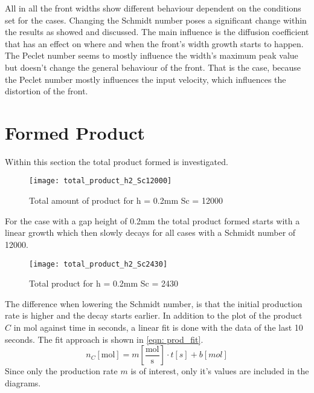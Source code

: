 \documentclass[../thesis.tex]{subfiles}
\begin{document}
All in all the front widths show different behaviour dependent on the conditions set for the cases. Changing the Schmidt number poses a significant change within the results as showed and discussed. The main influence is the diffusion coefficient that has an effect on where and when the front's width growth starts to happen. The Peclet number seems to mostly influence the width's maximum peak value but doesn't change the general behaviour of the front. That is the case, because the Peclet number mostly influences the input velocity, which influences the distortion of the front.

\section{Formed Product}

Within this section the total product formed is investigated. 

\begin{figure}[htb]
	\centering
	\texttt{[image: total\_product\_h2\_Sc12000]}
	\caption{Total amount of product for h = 0.2mm Sc = 12000}
	\label{fig: total_prod_h2_Sc12000}
\end{figure}
For the case with a gap height of 0.2mm the total product formed starts with a linear growth which then slowly decays for all cases with a Schmidt number of 12000.
\begin{figure}[htb]
	\centering
	\texttt{[image: total\_product\_h2\_Sc2430]}
	\caption{Total product for  h = 0.2mm Sc = 2430}
	\label{fig: total_prod_h2_Sc2430}
\end{figure}
The difference when lowering the Schmidt number, is that the initial production rate is higher and the decay starts earlier. In addition to the plot of the product $C$ in mol against time in seconds, a linear fit is done with the data of the last 10 seconds. The fit approach is shown in \autoref{eqn: prod_fit}.
\begin{equation}
	\label{eqn: prod_fit}
	n_C \left[ \text{mol} \right] = m \left[\frac{\text{mol}}{\text{s}}\right] \cdot t \left[s\right] + b \left[mol\right]
\end{equation}
Since only the production rate $m$ is of interest, only it's values are included in the diagrams.
\end{document}
